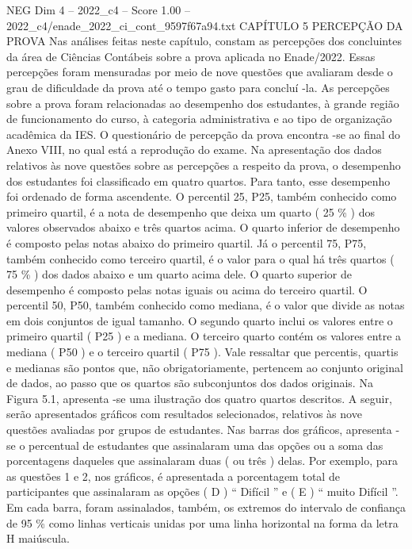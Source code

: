 \begin{textsample}{NEG Dim 4 – 2022\_c4 – Score 1.00 – 2022\_c4/enade\_2022\_ci\_cont\_9597f67a94.txt}  \label{ex:f4_neg_217}
CAPÍTULO 5 PERCEPÇÃO DA PROVA Nas análises feitas neste capítulo, constam as percepções dos concluintes da área de Ciências Contábeis sobre a prova aplicada no Enade/2022.
Essas percepções foram mensuradas por meio de nove questões que avaliaram desde o grau de dificuldade da prova até o tempo gasto para concluí -la.
As percepções sobre a prova foram relacionadas ao desempenho dos estudantes, à grande região de funcionamento do curso, à categoria administrativa e ao tipo de organização acadêmica da IES.
O questionário de percepção da prova encontra -se ao final do Anexo VIII, no qual está a reprodução do exame.
Na apresentação dos dados relativos às nove questões sobre as percepções a respeito da prova, o desempenho dos estudantes foi classificado em quatro quartos.
Para tanto, esse desempenho foi ordenado de forma ascendente.
O percentil 25, P25, também conhecido como primeiro quartil, é a nota de desempenho que deixa um quarto ( 25 \% ) dos valores observados abaixo e três quartos acima.
O quarto inferior de desempenho é composto pelas notas abaixo do primeiro quartil.
Já o percentil 75, P75, também conhecido como terceiro quartil, é o valor para o qual há três quartos ( 75 \% ) dos dados abaixo e um quarto acima dele.
O quarto superior de desempenho é composto pelas notas iguais ou acima do terceiro quartil.
O percentil 50, P50, também conhecido como mediana, é o valor que divide as notas em dois conjuntos de igual tamanho.
O segundo quarto inclui os valores entre o primeiro quartil ( P25 ) e a mediana.
O terceiro quarto contém os valores entre a mediana ( P50 ) e o terceiro quartil ( P75 ).
Vale ressaltar que percentis, quartis e medianas são pontos que, não obrigatoriamente, pertencem ao conjunto original de dados, ao passo que os quartos são subconjuntos dos dados originais.
Na Figura 5.1, apresenta -se uma ilustração dos quatro quartos descritos.
A seguir, serão apresentados gráficos com resultados selecionados, relativos às nove questões avaliadas por grupos de estudantes.
Nas barras dos gráficos, apresenta -se o percentual de estudantes que assinalaram uma das opções ou a soma das porcentagens daqueles que assinalaram duas ( ou três ) delas.
Por exemplo, para as questões 1 e 2, nos gráficos, é apresentada a porcentagem total de participantes que assinalaram as opções ( D ) “ Difícil ” e ( E ) “ muito Difícil ”.
Em cada barra, foram assinalados, também, os extremos do intervalo de confiança de 95 \% como linhas verticais unidas por uma linha horizontal na forma da letra H maiúscula.

\end{textsample}
